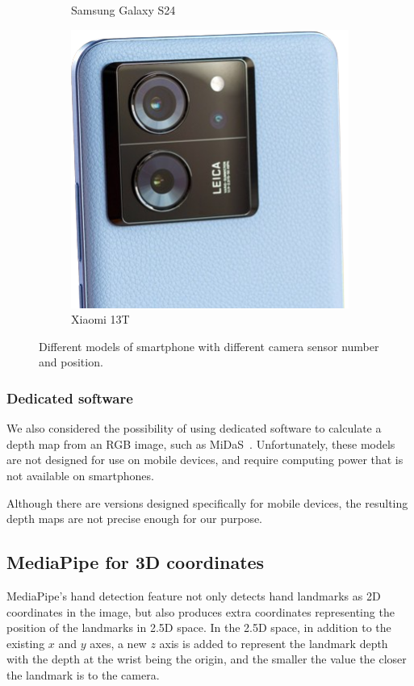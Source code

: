 \begin{figure}[ht]
\begin{subfigure}{0.3\textwidth}
		\caption{Samsung Galaxy S24}
	\end{subfigure}
	\hfill
	\begin{subfigure}{0.3\textwidth}
		\centering
		\includegraphics[width=\textwidth]{images/back-camera-redmi-13t}
		\caption{Xiaomi 13T}
	\end{subfigure}
	\caption{Different models of smartphone with different camera sensor number and position.}
	\label{fig:back-cameras}
\end{figure}

\subsubsection{Dedicated software}
We also considered the possibility of using dedicated software to calculate a depth map from an RGB image,
such as MiDaS~\cite{midas}.
Unfortunately, these models are not designed for use on mobile devices,
and require computing power that is not available on smartphones.

Although there are versions designed specifically for mobile devices,
the resulting depth maps are not precise enough for our purpose.

\subsection{MediaPipe for 3D coordinates}\label{subsec:mp-for-3d}
MediaPipe's hand detection feature not only detects hand landmarks as 2D coordinates in the image,
but also produces extra coordinates representing the position of the landmarks in 2.5D space.
In the 2.5D space, in addition to the existing $x$ and $y$ axes, a new $z$ axis is added to represent the landmark
depth with the depth at the wrist being the origin, and the smaller the value the closer the landmark is to the camera.

